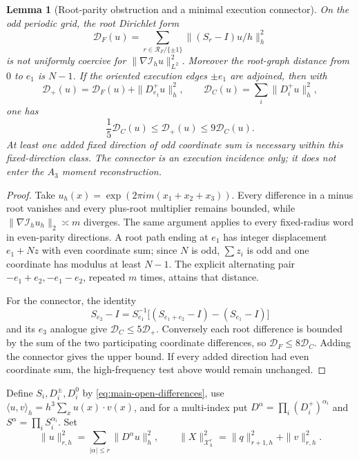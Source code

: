 \documentclass[11pt]{article}
\newtheorem{lemma}[lemma]{Lemma}
\theoremstyle{definition}
\theoremstyle{remark}
\begin{document}
\begin{lemma}[Root-parity obstruction and a minimal execution connector]
\label{lem:supp-open-parity}
On the odd periodic grid, the root Dirichlet form
\begin{equation}
 \mathcal D_F(u)=\sum_{r\in\mathcal R_F/\{\pm1\}}
       \|(S_r-I)u/h\|_h^2
 \label{eq:supp-open-root-dirichlet}
\end{equation}
is not uniformly coercive for
$\|\nabla\mathcal I_hu\|_{L^2}^2$.  Moreover the root-graph distance from
$0$ to $e_1$ is $N-1$.  If the oriented execution edges $\pm e_1$ are
adjoined, then with
\begin{equation}
 \mathcal D_+(u)=\mathcal D_F(u)+\|D_{e_1}^+u\|_h^2,
 \qquad \mathcal D_C(u)=\sum_i\|D_i^+u\|_h^2,
 \label{eq:supp-open-connector-energy}
\end{equation}
one has
\begin{equation}
 \boxed{\frac15\mathcal D_C(u)\le\mathcal D_+(u)\le9\mathcal D_C(u).}
 \label{eq:supp-open-connector-coercivity}
\end{equation}
At least one added fixed direction of odd coordinate sum is necessary within
this fixed-direction class.  The connector is an execution incidence only;
it does not enter the $A_3$ moment reconstruction.
\end{lemma}
\begin{proof}
Take
$u_h(x)=\exp(2\pi i m(x_1+x_2+x_3))$.  Every difference in a minus root
vanishes and every plus-root multiplier remains bounded, while
$\|\nabla\mathcal I_hu_h\|_2\asymp m$ diverges.  The same argument applies to
every fixed-radius word in even-parity directions.  A root path ending at
$e_1$ has integer displacement $e_1+Nz$ with even coordinate sum; since $N$
is odd, $\sum z_i$ is odd and one coordinate has modulus at least $N-1$.
The explicit alternating pair $-e_1+e_2,-e_1-e_2$, repeated $m$ times,
attains that distance.

For the connector, the identity
\[
 S_{e_2}-I=S_{e_1}^{-1}\bigl[(S_{e_1+e_2}-I)-(S_{e_1}-I)\bigr]
\]
and its $e_3$ analogue give
$\mathcal D_C\le5\mathcal D_+$.  Conversely each root difference is bounded
by the sum of the two participating coordinate differences, so
$\mathcal D_F\le8\mathcal D_C$.  Adding the connector gives the upper bound.
If every added direction had even coordinate sum, the high-frequency test
above would remain unchanged.
\end{proof}

Define $S_i,D_i^\pm,D_i^0$ by \eqref{eq:main-open-differences}, use
$\langle u,v\rangle_h=h^3\sum_xu(x)\cdot v(x)$, and for a multi-index put
$D^\alpha=\prod_i(D_i^+)^{\alpha_i}$ and
$S^\alpha=\prod_iS_i^{\alpha_i}$.  Set
\begin{equation}
 \|u\|_{r,h}^2=\sum_{|\alpha|\le r}\|D^\alpha u\|_h^2,
 \qquad
 \|X\|_{\mathcal X_h^r}^2=\|q\|_{r+1,h}^2+\|v\|_{r,h}^2.
 \label{eq:supp-open-norms}
\end{equation}
\end{document}
